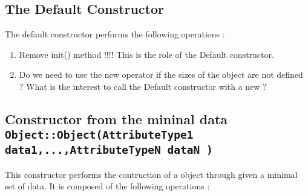 \subsection{The Default Constructor}

The default constructor performs the following operations :







\begin{ndr}
  \begin{enumerate}
  \item Remove init() method !!!! This is the role of the Default constructor.
  \item Do we need to use the new operator if the sizes of the object are not defined ? What is the interest to call the Default constructor with a new ?
  \end{enumerate}

\end{ndr}

\subsection{Constructor from the mininal data {\small \tt Object::Object(AttributeType1 data1,...,AttributeTypeN dataN ) }}

This constructor performs  the contruction of a object through given a minimal set of data.  It is composed of the following operations :


